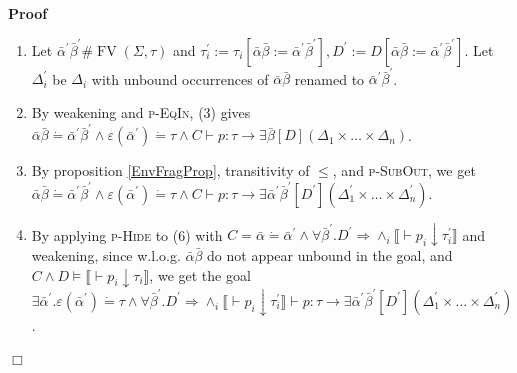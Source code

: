 \documentclass{article}
\newcommand{\assign}{:=}
\newcommand{\tmname}[1]{\textsc{#1}}
\newcommand{\tmop}[1]{\ensuremath{\operatorname{#1}}}
\newenvironment{proof}{\noindent\textbf{Proof\ }}{\hspace*{\fill}$\Box$\medskip}
\begin{document}
\begin{proof}
\begin{itemize}
\begin{enumerate}
      \item Let $\bar{\alpha}^{\prime} \bar{\beta}^{\prime} \# \tmop{FV}
      (\Sigma, \tau)$ and $\tau_i^{\prime} \assign \tau_i [\bar{\alpha}
      \bar{\beta} \assign \bar{\alpha}^{\prime} \bar{\beta}^{\prime}],
      D^{\prime} \assign D [\bar{\alpha} \bar{\beta} \assign
      \bar{\alpha}^{\prime} \bar{\beta}^{\prime}]$. Let $\Delta_i^{\prime}$ be
      $\Delta_i$ with unbound occurrences of $\bar{\alpha} \bar{\beta}$
      renamed to $\bar{\alpha}^{\prime} \bar{\beta}^{\prime}$.
      
      \item By weakening and {\tmname{p-EqIn}}, (3) gives $\bar{\alpha}
      \bar{\beta} \dot{=} \bar{\alpha}^{\prime} \bar{\beta}^{\prime} \wedge
      \varepsilon (\bar{\alpha}^{\prime}) \dot{=} \tau \wedge C \vdash p :
      \tau \longrightarrow \exists \bar{\beta} [D] (\Delta_1 \times \ldots
      \times \Delta_n)$.
      
      \item By proposition \ref{EnvFragProp}, transitivity of $\leqslant$, and
      {\tmname{p-SubOut}}, we get $\bar{\alpha} \bar{\beta} \dot{=}
      \bar{\alpha}^{\prime} \bar{\beta}^{\prime} \wedge \varepsilon
      (\bar{\alpha}^{\prime}) \dot{=} \tau \wedge C \vdash p : \tau
      \longrightarrow \exists \bar{\alpha}^{\prime} \bar{\beta}^{\prime}
      [D^{\prime}] (\Delta_1^{\prime} \times \ldots \times
      \Delta_n^{\prime})$.
      
      \item By applying {\tmname{p-Hide}} to (6) with $C = \bar{\alpha}
      \dot{=} \bar{\alpha}^{\prime} \wedge \forall \bar{\beta}^{\prime}
      .D^{\prime} \Rightarrow \wedge_i \llbracket \vdash p_i \downarrow
      \tau_i^{\prime} \rrbracket$ and weakening, since w.l.o.g. $\bar{\alpha}
      \bar{\beta}$ do not appear unbound in the goal, and $C \wedge D \vDash
      \llbracket \vdash p_i \downarrow \tau_i \rrbracket$, we get the goal
      $\exists \bar{\alpha}^{\prime} . \varepsilon (\bar{\alpha}^{\prime})
      \dot{=} \tau \wedge \forall \bar{\beta}^{\prime} .D^{\prime} \Rightarrow
      \wedge_i \llbracket \vdash p_i \downarrow \tau_i^{\prime} \rrbracket
      \vdash p : \tau \longrightarrow \exists \bar{\alpha}^{\prime}
      \bar{\beta}^{\prime} [D^{\prime}] (\Delta_1^{\prime} \times \ldots
      \times \Delta_n^{\prime})$.
    \end{enumerate}
  \end{itemize}
\end{proof}
\end{document}
